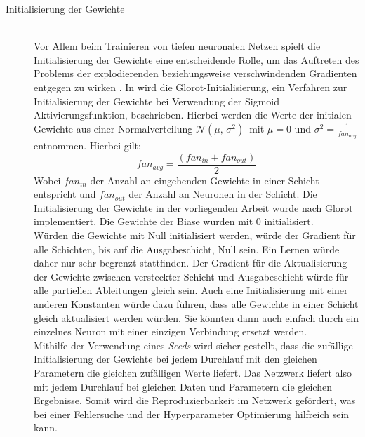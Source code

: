 \begin{description}
	\item[Initialisierung der Gewichte]\hfill \\
	Vor Allem beim Trainieren von tiefen neuronalen Netzen spielt die Initialisierung der Gewichte eine entscheidende Rolle, um das Auftreten des Problems der explodierenden beziehungsweise verschwindenden Gradienten entgegen zu wirken \cite{geron2017hands-on}. In \cite{Glorot10understandingthe} wird die Glorot-Initialisierung, ein Verfahren zur Initialisierung der Gewichte bei Verwendung der Sigmoid Aktivierungsfunktion, beschrieben. Hierbei werden die Werte der initialen Gewichte aus einer Normalverteilung $\mathcal{N}(\mu,\,\sigma^{2})\,$ mit $\mu = 0$ und $\sigma^{2}=\frac{1}{fan_{avg}}$ entnommen. Hierbei gilt: 
	\[
	fan_{avg}=\frac{(fan_{in}+fan_{out})}{2}
	\]
	Wobei $fan_{in}$ der Anzahl an eingehenden Gewichte in einer Schicht entspricht und  $fan_{out}$ der Anzahl an Neuronen in der Schicht. Die Initialisierung der Gewichte in der vorliegenden Arbeit wurde  nach Glorot implementiert. Die Gewichte der Biase wurden mit 0 initialisiert.\\
	\noindent \hspace*{7mm}
	Würden die Gewichte mit Null initialisiert werden, würde der Gradient für alle Schichten, bis auf die Ausgabeschicht, Null sein. Ein Lernen würde daher nur sehr begrenzt stattfinden. Der Gradient für die Aktualisierung der Gewichte zwischen versteckter Schicht und Ausgabeschicht würde für alle partiellen Ableitungen gleich sein. Auch eine Initialisierung mit einer anderen Konstanten würde dazu führen, dass alle Gewichte in einer Schicht gleich aktualisiert werden würden. Sie könnten dann auch einfach durch ein einzelnes Neuron mit einer einzigen Verbindung ersetzt werden.\\
	\noindent\hspace*{7mm}
	Mithilfe der Verwendung eines \emph{Seeds} wird sicher gestellt, dass die zufällige Initialisierung der Gewichte bei jedem Durchlauf mit den gleichen Parametern die gleichen zufälligen Werte liefert. Das Netzwerk liefert also mit jedem Durchlauf bei gleichen Daten und Parametern die gleichen Ergebnisse. Somit wird die Reproduzierbarkeit im Netzwerk gefördert, was bei einer Fehlersuche und der Hyperparameter Optimierung hilfreich sein kann.
	
\end{description}
